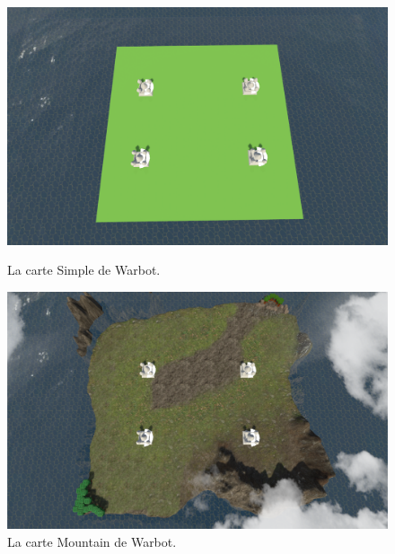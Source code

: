 \documentclass{report}
\begin{document}
\begin{figure}[h]
    \begin{minipage}[c]{.46\linewidth}
        \centering
        \includegraphics[scale=0.25]{MapSimpleImage}
        \caption{La carte Simple de Warbot.}
    \end{minipage}
    \hfill%
    \begin{minipage}[c]{.46\linewidth}
        \centering
        \includegraphics[scale=0.25]{MapMountainImage}
       \caption{La carte Mountain de Warbot.}
    \end{minipage}
\end{figure}
\end{document}
